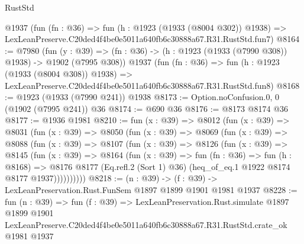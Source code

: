 \begin{lexlean}{RustStd}
\begin{coremodule}
    @1937
    (fun (fn : @36) =>
    fun (h : @1923 (@1933 (@8004 @302)) @1938) =>
    LexLeanPreserve.C20ded4f4be0e5011a640fb6c30888a67.R31.RustStd.fun7)
@8164 := @7980
    (fun (y : @39) => (fn : @36) -> (h : @1923 (@1933 (@7990 @308)) @1938) -> @1902 (@7995 @308))
    @1937
    (fun (fn : @36) =>
    fun (h : @1923 (@1933 (@8004 @308)) @1938) =>
    LexLeanPreserve.C20ded4f4be0e5011a640fb6c30888a67.R31.RustStd.fun8)
@8168 := @1923 (@1933 (@7990 @241)) @1938
@8173 := Option.noConfusion.{0, 0} (@1902 (@7995 @241)) @36
@8174 := @690 @36
@8176 := @8173 @8174 @36
@8177 := @1936 @1981
@8210 := fun (x : @39) =>
  @8012
    (fun (x : @39) =>
    @8031
      (fun (x : @39) =>
      @8050
        (fun (x : @39) =>
        @8069
          (fun (x : @39) =>
          @8088
            (fun (x : @39) =>
            @8107
              (fun (x : @39) =>
              @8126
                (fun (x : @39) =>
                @8145
                  (fun (x : @39) =>
                  @8164
                    (fun (x : @39) =>
                    fun (fn : @36) =>
                    fun (h : @8168) =>
                    @8176
                      @8177
                      (Eq.refl.{2} (Sort 1) @36)
                      (heq_of_eq.{1} @1922 @8174 @8177 @1937))))))))))
@8218 := (n : @39) -> (f : @39) -> LexLeanPreservation.Rust.FunSem @1897 @1899 @1901 @1981 @1937
@8228 := fun (n : @39) =>
  fun (f : @39) =>
  LexLeanPreservation.Rust.simulate
    @1897
    @1899
    @1901
    LexLeanPreserve.C20ded4f4be0e5011a640fb6c30888a67.R31.RustStd.crate_ok
    @1981
    @1937
\end{coremodule}
\end{lexlean}
